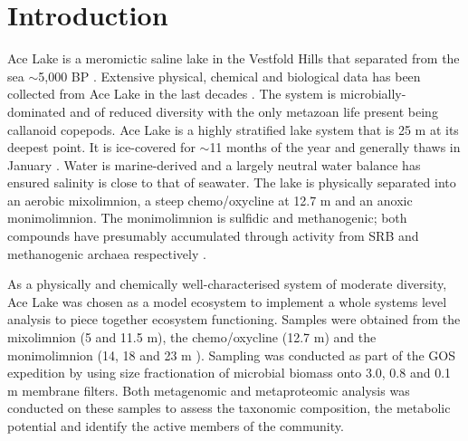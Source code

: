 \section{Introduction}
\acresetall
Ace Lake is a meromictic saline lake in the Vestfold Hills that separated from the sea $\sim$5,000 BP \cite{Bird1991}. 
Extensive physical, chemical and biological data has been collected from Ace Lake in the last decades \cite{Rankin1999}.
The system is microbially-dominated and of reduced diversity \cite{Bowman2000a} with the only metazoan life present being callanoid copepods. %
Ace Lake is a highly stratified lake system that is 25 m at its deepest point.
It is ice-covered for $\sim$11 months of the year and generally thaws in January \cite{Rankin1999}.
Water is marine-derived and a largely neutral water balance has ensured salinity is close to that of seawater.
The lake is physically separated into an aerobic mixolimnion, a steep chemo/oxycline at 12.7 m and an anoxic monimolimnion.
The monimolimnion is sulfidic and methanogenic; both compounds have presumably accumulated through activity from \ac{SRB} and methanogenic archaea respectively \cite{Rankin1999, Lauro2011}.

As a physically and chemically well-characterised system of moderate diversity, Ace Lake was chosen as a model ecosystem to implement a whole systems level analysis to piece together ecosystem functioning.
Samples were obtained from the mixolimnion (5 and 11.5 m), the chemo/oxycline (12.7 m) and the monimolimnion (14, 18 and 23 m ).
Sampling was conducted as part of the \ac{GOS} expedition \cite{Rusch2007} by using size fractionation of microbial biomass onto 3.0, 0.8 and 0.1 \textmu{}m membrane filters.
Both metagenomic and metaproteomic analysis was conducted on these samples to assess the taxonomic composition, the metabolic potential and identify the active members of the community.

